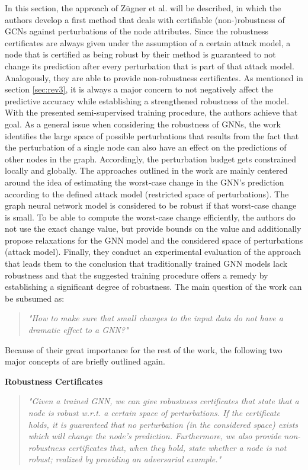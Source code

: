\documentclass[a4paper,preprint]{sig-alternate}
\begin{document}
In this section, the approach of Zügner et al. \cite{Zuegner_2019} will be described,
in which the authors develop a first method that deals with certifiable (non-)robustness of GCNs against perturbations of
the node attributes. Since the robustness certificates are always given under the assumption of a certain attack model,
a node that is certified as being robust by their method is guaranteed to not change its prediction after every perturbation that is
part of that attack model. Analogously, they are able to provide non-robustness certificates.
As mentioned in section \ref{sec:rev3}, it is always a major concern to not negatively affect the predictive accuracy 
while establishing a strengthened robustness of the model. With the presented semi-supervised training procedure, the authors achieve that goal.
As a general issue when considering the robustness of GNNs, the work identifies the large space of possible perturbations
that results from the fact that the perturbation of a single node can also have an effect on the predictions of other nodes in the graph.
Accordingly, the perturbation budget gets constrained locally and globally.
The approaches outlined in the work are mainly centered around the idea of estimating the worst-case change in the GNN's prediction according
to the defined attack model (restricted space of perturbations). The graph neural network model is considered to be robust
if that worst-case change is small.
To be able to compute the worst-case change efficiently, the authors do not use the exact change value, but provide bounds on the value
and additionally propose relaxations for the GNN model and the considered space of perturbations (attack model). 
Finally, they conduct an experimental evaluation of the approach that leads them to the conclusion that 
traditionally trained GNN models lack robustness and that the suggested training procedure offers a remedy by establishing
a significant degree of robustness. The main question of the work can be subsumed as:
\begin{quote}
    \emph{"How to make sure that small changes to the input data do not have a dramatic effect to a GNN?"} \cite{Zuegner_2019}
\end{quote}
Because of their great importance for the rest of the work, the following two major concepts of \cite{Zuegner_2019} are briefly 
outlined again.\newline

\textbf{Robustness Certificates}
\begin{quote}
    \emph{"Given a trained GNN, we can give robustness certificates that state that a node is robust w.r.t. a certain space of perturbations. 
    If the certificate holds, it is guaranteed that no perturbation (in the considered space) exists which will change the node's prediction. 
    Furthermore, we also provide non-robustness certificates that, when they hold, state whether a node is not robust; realized by providing 
    an adversarial example."} \cite{Zuegner_2019}
\end{quote}
\end{document}
